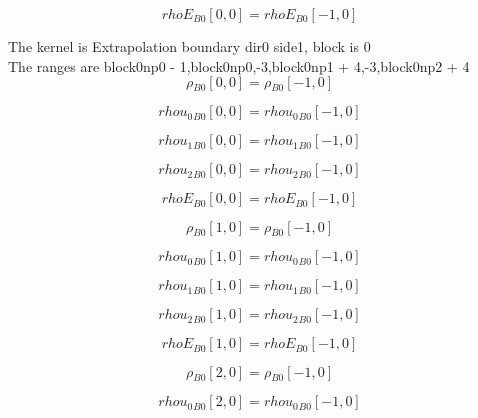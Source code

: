 \documentclass{article}
\begin{document}
\begin{dmath}{rhoE{_{B0}}}[{0,0}] = {rhoE{_{B0}}}[{-1,0}]\end{dmath}

\noindent The kernel is Extrapolation boundary dir0 side1, block is 0\\\noindent The ranges are block0np0 - 1,block0np0,-3,block0np1 + 4,-3,block0np2 + 4\\\begin{dmath}{\rho{_{B0}}}[{0,0}] = {\rho{_{B0}}}[{-1,0}]\end{dmath}

\begin{dmath}{rhou_{0}{_{B0}}}[{0,0}] = {rhou_{0}{_{B0}}}[{-1,0}]\end{dmath}

\begin{dmath}{rhou_{1}{_{B0}}}[{0,0}] = {rhou_{1}{_{B0}}}[{-1,0}]\end{dmath}

\begin{dmath}{rhou_{2}{_{B0}}}[{0,0}] = {rhou_{2}{_{B0}}}[{-1,0}]\end{dmath}

\begin{dmath}{rhoE{_{B0}}}[{0,0}] = {rhoE{_{B0}}}[{-1,0}]\end{dmath}

\begin{dmath}{\rho{_{B0}}}[{1,0}] = {\rho{_{B0}}}[{-1,0}]\end{dmath}

\begin{dmath}{rhou_{0}{_{B0}}}[{1,0}] = {rhou_{0}{_{B0}}}[{-1,0}]\end{dmath}

\begin{dmath}{rhou_{1}{_{B0}}}[{1,0}] = {rhou_{1}{_{B0}}}[{-1,0}]\end{dmath}

\begin{dmath}{rhou_{2}{_{B0}}}[{1,0}] = {rhou_{2}{_{B0}}}[{-1,0}]\end{dmath}

\begin{dmath}{rhoE{_{B0}}}[{1,0}] = {rhoE{_{B0}}}[{-1,0}]\end{dmath}

\begin{dmath}{\rho{_{B0}}}[{2,0}] = {\rho{_{B0}}}[{-1,0}]\end{dmath}

\begin{dmath}{rhou_{0}{_{B0}}}[{2,0}] = {rhou_{0}{_{B0}}}[{-1,0}]\end{dmath}
\end{document}
